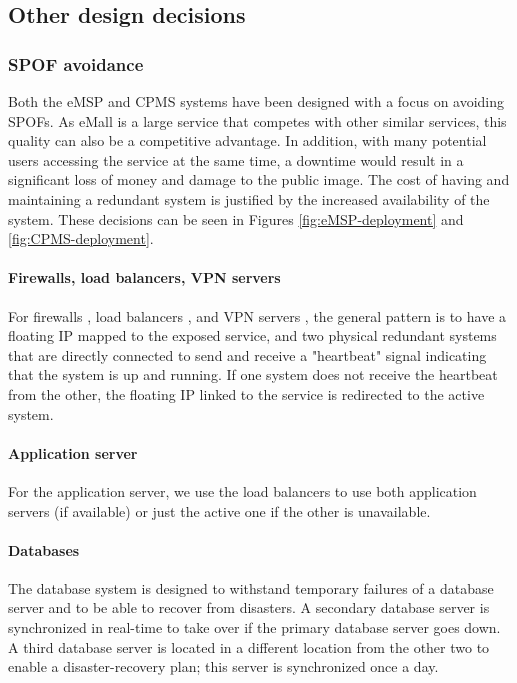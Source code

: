 \subsection{Other design decisions}
\subsubsection{\ac{SPOF} avoidance}
Both the \ac{eMSP} and \ac{CPMS} systems have been designed with a focus on avoiding \acp{SPOF}. As \ac{eMall} is a large service that competes with other similar services, this quality can also be a competitive advantage. In addition, with many potential users accessing the service at the same time, a downtime would result in a significant loss of money and damage to the public image. The cost of having and maintaining a redundant system is justified by the increased availability of the system.
These decisions can be seen in Figures \autoref{fig:eMSP-deployment} and \autoref{fig:CPMS-deployment}.
\paragraph{Firewalls, load balancers, \ac{VPN} servers}
For firewalls \cite{ref:redundant-firewalls}, load balancers \cite{ref:redundant-load-balancers}, and \ac{VPN} servers \cite{ref:redundant-VPN-servers}, the general pattern is to have a floating IP \cite{ref:floating-ip} mapped to the exposed service, and two physical redundant systems that are directly connected to send and receive a "heartbeat" signal indicating that the system is up and running. If one system does not receive the heartbeat from the other, the floating IP linked to the service is redirected to the active system.
\paragraph{Application server}
For the application server, we use the load balancers to use both application servers (if available) or just the active one if the other is unavailable.
\paragraph{Databases}
The database system is designed to withstand temporary failures of a database server and to be able to recover from disasters. A secondary database server is synchronized in real-time to take over if the primary database server goes down. A third database server is located in a different location from the other two to enable a disaster-recovery plan; this server is synchronized once a day.
\clearpage